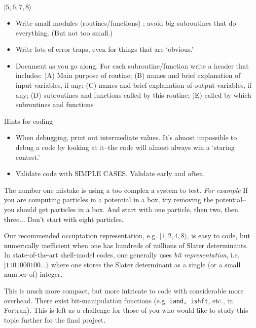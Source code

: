 $|            5        ,        6     ,           7     ,           8  \rangle $

\begin{itemize}

\item Write small modules (routines/functions) ; avoid big subroutines 
that do everything. (But not too small.)

\item Write lots of error traps, even for things that are `obvious.'

\item Document as you go along.  For each subroutine/function write
a header that includes: (A) Main purpose of routine; (B) names and 
brief explanation of input 
variables, if any; (C) names and brief explanation of output variables, 
if any; (D) subroutines and functions called by this routine; (E)
called by which subroutines and functions

\end{itemize}

Hints for coding

\begin{itemize}

\item When debugging, print out intermediate values. It's almost impossible to debug a 
code by looking at it--the code will almost always win a `staring contest.'

\item Validate code with SIMPLE CASES. Validate early and often.   

\end{itemize}

The number one mistake is using a too complex a system to test. \textit{For example} 
If you are computing particles in a potential in a box, try removing the potential--you should get 
particles in a box. And start with one particle, then two, then three... Don't start with 
eight particles.

Our recommended occuptation representation, e.g. $| 1,2,4,8 \rangle$, is 
easy to code, but numerically inefficient when one has hundreds of 
millions of Slater determinants.
In state-of-the-art shell-model codes, one generally uses \textit{bit 
representation}, i.e. $|1101000100... \rangle$ where one stores 
the Slater determinant as a single (or a small number of) integer.

This is much more compact, but more intricate to code with considerable 
more overhead. There exist 
bit-manipulation functions (e.g. {\tt iand, ishft}, etc., in Fortran).  
This is left as a challenge for those of you who would like to study this topic further for the final project.


